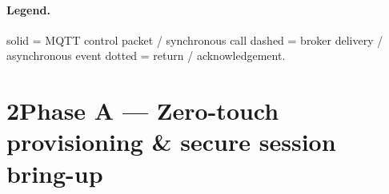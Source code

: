 \documentclass[11pt,a4paper]{article}
\begin{document}
\paragraph{Legend.}
 solid = MQTT control packet / synchronous call\quad
{} dashed = broker delivery / asynchronous event\quad
{} dotted = return / acknowledgement.

\newpage
\section*{2\quad Phase A — Zero-touch provisioning \& secure session bring-up}
\end{document}
